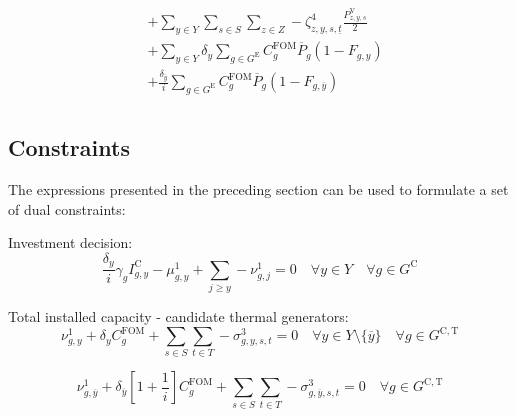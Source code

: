 \documentclass{article}
\newcommand{\sGeneratorsExisting}{G^{\mathrm{E}}}
\newcommand{\sGeneratorsCandidate}{G^{\mathrm{C}}}
\newcommand{\sGeneratorsCandidateThermal}{G^{\mathrm{C,T}}}
\newcommand{\sYears}{Y}
\newcommand{\sScenarios}{S}
\newcommand{\sIntervals}{T}
\newcommand{\sZones}{Z}
\newcommand{\iGenerator}{g}
\newcommand{\iYear}{y}
\newcommand{\iYearTerminal}{\overline{\iYear}}
\newcommand{\iYearAlias}{j}
\newcommand{\iScenario}{s}
\newcommand{\iInterval}{t}
\newcommand{\iIntervalStart}{\underline{\iInterval}}
\newcommand{\iZone}{z}
\newcommand{\cFixedOperationsMaintenanceCostGenerator}[1][\iGenerator]{C^{\mathrm{FOM}}_{#1}}
\newcommand{\cPowerOutputMax}[1][\iGenerator,\iYear]{\overline{P}_{#1}}
\newcommand{\cAmortisationRate}[1][\iGenerator]{\gamma_{#1}}
\newcommand{\cCandidateInvestmentCost}[1][\iGenerator,\iYear]{I^{\mathrm{C}}_{#1}}
\newcommand{\cInterestRate}{i}
\newcommand{\cRetirementIndicator}[1][\iGenerator,\iYear]{F_{#1}}
\newcommand{\cDiscountRate}[1][\iYear]{\delta_{#1}}
\newcommand{\cLostLoadPowerInitial}[1][\iZone,\iYear,\iScenario]{P_{#1}^{\mathrm{V}}}
\newcommand{\dNonNegativeCandidateCapacity}[1][\iGenerator,\iYear]{\mu_{#1}^{1}}
\newcommand{\dTotalInstallCapacity}[1][\iGenerator,\iYear]{\nu_{#1}^{1}}
\newcommand{\dMaxPowerOutputCandidateThermal}[1][\iGenerator,\iYear,\iScenario,\iInterval]{\sigma_{#1}^{3}}
\newcommand{\dLostLoadEnergy}[1][\iZone,\iYear,\iScenario,\iInterval]{\zeta_{#1}^{4}}
\begin{document}
\begin{align}
& + \sum\limits_{\iYear \in \sYears}\sum\limits_{\iScenario \in \sScenarios}\sum\limits_{\iZone \in \sZones} - \dLostLoadEnergy[\iZone, \iYear,\iScenario,\iIntervalStart] \frac{\cLostLoadPowerInitial}{2}\\
& + \sum\limits_{\iYear \in \sYears} \cDiscountRate \sum\limits_{\iGenerator \in \sGeneratorsExisting} \cFixedOperationsMaintenanceCostGenerator \cPowerOutputMax[\iGenerator] \left(1 - \cRetirementIndicator\right)\\
& + \frac{\cDiscountRate[\iYearTerminal]}{\cInterestRate} \sum\limits_{\iGenerator \in \sGeneratorsExisting} \cFixedOperationsMaintenanceCostGenerator \cPowerOutputMax[\iGenerator] \left(1 - \cRetirementIndicator[\iGenerator,\iYearTerminal]\right)\\
\end{align}

\subsection{Constraints}
The expressions presented in the preceding section can be used to formulate a set of dual constraints:

Investment decision:
\begin{equation}
\frac{\cDiscountRate}{\cInterestRate} \cAmortisationRate \cCandidateInvestmentCost - \dNonNegativeCandidateCapacity + \sum\limits_{\iYearAlias \geq \iYear} -\dTotalInstallCapacity[\iGenerator,\iYearAlias] = 0 \quad \forall \iYear \in \sYears \quad \forall \iGenerator \in \sGeneratorsCandidate
\end{equation}

Total installed capacity - candidate thermal generators:
\begin{equation}
 \dTotalInstallCapacity + \cDiscountRate \cFixedOperationsMaintenanceCostGenerator + \sum\limits_{\iScenario \in \sScenarios}\sum\limits_{\iInterval \in \sIntervals} - \dMaxPowerOutputCandidateThermal = 0 \quad \forall \iYear \in \sYears \setminus \{\iYearTerminal\} \quad \forall \iGenerator \in \sGeneratorsCandidateThermal
\end{equation}

\begin{equation}
\dTotalInstallCapacity[\iGenerator,\iYearTerminal] + \cDiscountRate[\iYearTerminal] \left[1 + \frac{1}{\cInterestRate}\right] \cFixedOperationsMaintenanceCostGenerator + \sum\limits_{\iScenario \in \sScenarios}\sum\limits_{\iInterval \in \sIntervals} - \dMaxPowerOutputCandidateThermal[\iGenerator,\iYearTerminal,\iScenario,\iInterval] = 0 \quad \forall \iGenerator \in \sGeneratorsCandidateThermal
\end{equation}
\end{document}
